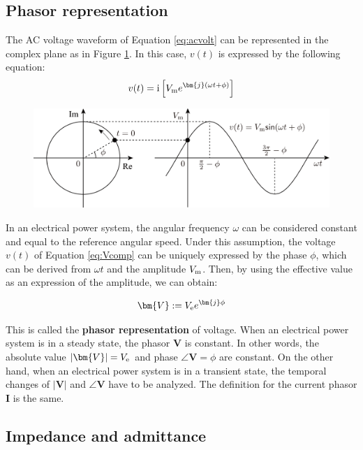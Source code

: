 \documentclass[graybox, envcountchap]{svmult}
\begin{document}
\subsection{Phasor representation}\label{sec:intphas}
The AC voltage waveform of Equation \ref{eq:acvolt} can be represented in the
complex plane as in Figure \ref{fig:phasorrep}. In this case, $v(t)$ is
expressed by the following equation:
\begin{equation}\label{eq:Vcomp}
  v(t)= \imag \left[ V_{\rm m} e^{\bm{j}(\omega t + \phi)} \right]
\end{equation}

\begin{figure}[t]
  \centering
  \includegraphics[width = .99\linewidth]{figs/phasorrep}
  \caption{\textbf{}}
  \label{fig:phasorrep}
  \medskip
\end{figure}
In an electrical power system, the angular frequency $\omega$ can be considered
constant and equal to the reference angular speed. Under this assumption, the
voltage $v(t)$ of Equation \ref{eq:Vcomp} can be uniquely expressed by the phase
$\phi$, which can be derived from $\omega t$ and the amplitude $V_{\rm m}$.
Then, by using the effective value as an expression of the amplitude, we can
obtain:

\begin{align}\label{eq:Vphasor}
  \bm{V}:= V_{\rm e} e^{\bm{j}\phi}
\end{align}

This is called the \textbf{phasor representation} of voltage. When an electrical
power system is in a steady state, the phasor $\bm{V}$ is constant. In other
words, the absolute value $|\bm{V}|=V_{\rm e}$ and phase $\angle \bm{V}=\phi$
are constant. On the other hand, when an electrical power system is in a
transient state, the temporal changes of $|\bm{V}|$ and $\angle \bm{V}$ have to
be analyzed. The definition for the current phasor $\bm{I}$ is the same.

\subsection{Impedance and admittance}
\end{document}
